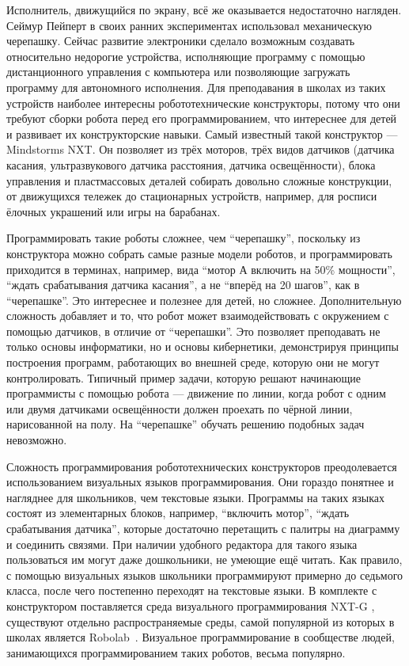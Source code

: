 Исполнитель, движущийся по экрану, всё же оказывается недостаточно нагляден. Сеймур Пейперт 
в своих ранних экспериментах использовал механическую черепашку. Сейчас развитие электроники 
сделало возможным создавать относительно недорогие устройства, исполняющие программу 
с помощью дистанционного управления с компьютера или позволяющие загружать программу 
для автономного исполнения. Для преподавания в школах из таких устройств наиболее 
интересны робототехнические конструкторы, потому что они требуют сборки робота перед 
его программированием, что интереснее для детей и развивает их конструкторские навыки. 
Самый известный такой конструктор --- Mindstorms NXT. Он позволяет из трёх моторов, 
трёх видов датчиков (датчика касания, ультразвукового датчика расстояния, датчика 
освещённости), блока управления и пластмассовых деталей собирать довольно сложные 
конструкции, от движущихся тележек до стационарных устройств, например, для росписи 
ёлочных украшений или игры на барабанах. 

Программировать такие роботы сложнее, чем "`черепашку"', поскольку из конструктора 
можно собрать самые разные модели роботов, и программировать приходится в терминах, 
например, вида "`мотор А включить на 50\% мощности"', "`ждать срабатывания датчика касания"', 
а не "`вперёд на 20 шагов"', как в "`черепашке"'. Это интереснее и полезнее для детей, 
но сложнее. Дополнительную сложность добавляет и то, что робот может взаимодействовать 
с окружением с помощью датчиков, в отличие от "`черепашки"'. Это позволяет преподавать 
не только основы информатики, но и основы кибернетики, демонстрируя принципы построения 
программ, работающих во внешней среде, которую они не могут контролировать. Типичный 
пример задачи, которую решают начинающие программисты с помощью робота --- движение по линии, 
когда робот с одним или двумя датчиками освещённости должен проехать по чёрной линии, 
нарисованной на полу. На "`черепашке"' обучать решению подобных задач невозможно.

Сложность программирования робототехнических конструкторов преодолевается использованием 
визуальных языков программирования. Они гораздо понятнее и нагляднее для школьников, 
чем текстовые языки. Программы на таких языках состоят из элементарных блоков, например, 
"`включить мотор"', "`ждать срабатывания датчика"', которые достаточно перетащить с 
палитры на диаграмму и соединить связями. При наличии удобного редактора для такого 
языка пользоваться им могут даже дошкольники, не умеющие ещё читать. Как правило, с 
помощью визуальных языков школьники программируют примерно до седьмого класса, после 
чего постепенно переходят на текстовые языки. В комплекте с конструктором поставляется среда визуального программирования NXT-G%
, существуют отдельно распространяемые среды, самой популярной из которых в школах является Robolab~\cite{portsmore1999robolab}. 
Визуальное программирование в сообществе людей, занимающихся программированием таких роботов, весьма популярно.

